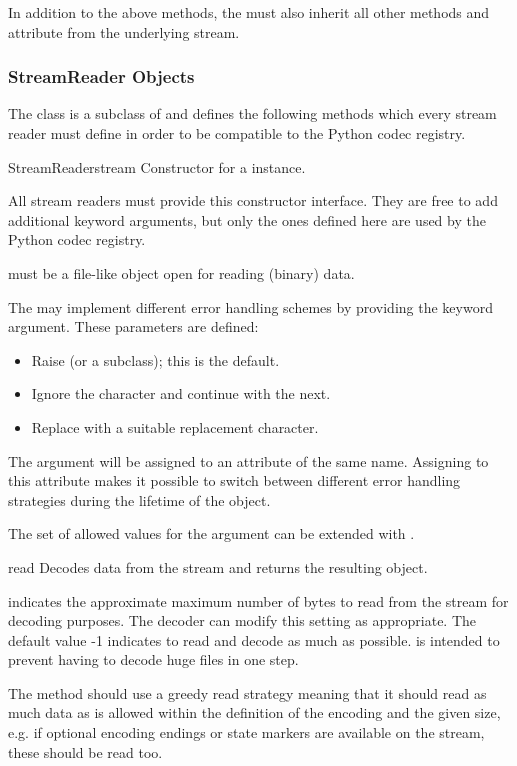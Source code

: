 In addition to the above methods, the  must also
inherit all other methods and attribute from the underlying stream.


\subsubsection{StreamReader Objects \label{stream-reader-objects}}

The  class is a subclass of  and
defines the following methods which every stream reader must define in
order to be compatible to the Python codec registry.

\begin{classdesc}{StreamReader}{stream}
  Constructor for a  instance. 

  All stream readers must provide this constructor interface. They are
  free to add additional keyword arguments, but only the ones defined
  here are used by the Python codec registry.

   must be a file-like object open for reading (binary)
  data.

  The  may implement different error handling
  schemes by providing the  keyword argument. These
  parameters are defined:

  \begin{itemize}
    \item {} Raise  (or a subclass);
                          this is the default.
    \item {} Ignore the character and continue with the next.
    \item {} Replace with a suitable replacement character.
  \end{itemize}

  The  argument will be assigned to an attribute of the
  same name. Assigning to this attribute makes it possible to switch
  between different error handling strategies during the lifetime
  of the  object.

  The set of allowed values for the  argument can
  be extended with .
\end{classdesc}

\begin{methoddesc}{read}{}
  Decodes data from the stream and returns the resulting object.

   indicates the approximate maximum number of bytes to read
  from the stream for decoding purposes. The decoder can modify this
  setting as appropriate. The default value -1 indicates to read and
  decode as much as possible.   is intended to prevent having
  to decode huge files in one step.

  The method should use a greedy read strategy meaning that it should
  read as much data as is allowed within the definition of the encoding
  and the given size, e.g.  if optional encoding endings or state
  markers are available on the stream, these should be read too.
\end{methoddesc}

